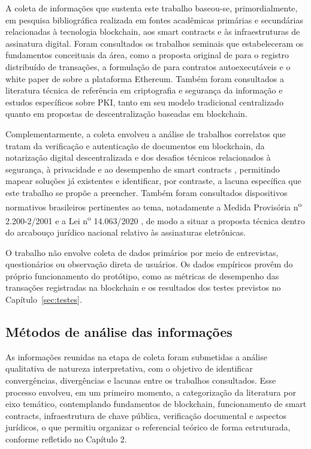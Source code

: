 \documentclass[
    12pt,
    a4paper,
    oneside,
    chapter=TITLE,
    section=TITLE,
    subsection=TITLE,
    subsubsection=TITLE,
    sumario=tradicional,
    english,
    brazil
]{abntex2}
\begin{document}
A coleta de informações que sustenta este trabalho baseou-se, primordialmente, em pesquisa bibliográfica realizada em fontes acadêmicas primárias e secundárias relacionadas à tecnologia blockchain, aos smart contracts e às infraestruturas de assinatura digital. Foram consultados os trabalhos seminais que estabeleceram os fundamentos conceituais da área, como a proposta original de  para o registro distribuído de transações, a formulação de  para contratos autoexecutáveis e o white paper de  sobre a plataforma Ethereum. Também foram consultados a literatura técnica de referência em criptografia e segurança da informação \cite{stallings2017} e estudos específicos sobre PKI, tanto em seu modelo tradicional centralizado \cite{cooper2008} quanto em propostas de descentralização baseadas em blockchain.

Complementarmente, a coleta envolveu a análise de trabalhos correlatos que tratam da verificação e autenticação de documentos em blockchain, da notarização digital descentralizada e dos desafios técnicos relacionados à segurança, à privacidade e ao desempenho de smart contracts \cite{alharby2017,zheng2018}, permitindo mapear soluções já existentes e identificar, por contraste, a lacuna específica que este trabalho se propõe a preencher. Também foram consultados dispositivos normativos brasileiros pertinentes ao tema, notadamente a Medida Provisória n\textsuperscript{o} 2.200-2/2001 \cite{brasil2001} e a Lei n\textsuperscript{o} 14.063/2020 \cite{brasil2020}, de modo a situar a proposta técnica dentro do arcabouço jurídico nacional relativo às assinaturas eletrônicas.

O trabalho não envolve coleta de dados primários por meio de entrevistas, questionários ou observação direta de usuários. Os dados empíricos provêm do próprio funcionamento do protótipo, como as métricas de desempenho das transações registradas na blockchain e os resultados dos testes previstos no Capítulo~\ref{sec:testes}.

\subsection{Métodos de análise das informações}

As informações reunidas na etapa de coleta foram submetidas a análise qualitativa de natureza interpretativa, com o objetivo de identificar convergências, divergências e lacunas entre os trabalhos consultados. Esse processo envolveu, em um primeiro momento, a categorização da literatura por eixo temático, contemplando fundamentos de blockchain, funcionamento de smart contracts, infraestrutura de chave pública, verificação documental e aspectos jurídicos, o que permitiu organizar o referencial teórico de forma estruturada, conforme refletido no Capítulo 2.
\end{document}
